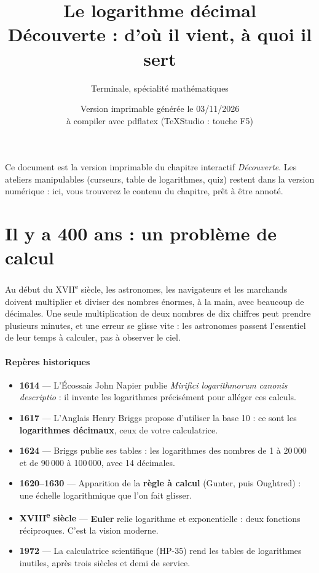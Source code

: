 \documentclass[11pt,a4paper]{article}
\title{Le logarithme décimal\\[2pt]\large Découverte : d'où il vient, à quoi il sert}
\author{Terminale, spécialité mathématiques}
\date{Version imprimable générée le 03/11/2026\\[2pt]\small à compiler avec pdflatex (TeXStudio : touche F5)}
\begin{document}
\maketitle

\noindent Ce document est la version imprimable du chapitre interactif \emph{Découverte}. Les ateliers manipulables (curseurs, table de logarithmes, quiz) restent dans la version numérique : ici, vous trouverez le contenu du chapitre, prêt à être annoté.

\section{Il y a 400 ans : un problème de calcul}
Au début du XVII\textsuperscript{e} siècle, les astronomes, les navigateurs et les marchands doivent multiplier et diviser des nombres énormes, à la main, avec beaucoup de décimales. Une seule multiplication de deux nombres de dix chiffres peut prendre plusieurs minutes, et une erreur se glisse vite : les astronomes passent l'essentiel de leur temps à calculer, pas à observer le ciel.

\paragraph{Repères historiques}
\begin{itemize}[leftmargin=1.5em,itemsep=2pt]
\item \textbf{1614} --- L'Écossais John Napier publie \emph{Mirifici logarithmorum canonis descriptio} : il invente les logarithmes précisément pour alléger ces calculs.
\item \textbf{1617} --- L'Anglais Henry Briggs propose d'utiliser la base 10 : ce sont les \textbf{logarithmes décimaux}, ceux de votre calculatrice.
\item \textbf{1624} --- Briggs publie ses tables : les logarithmes des nombres de 1 à 20\,000 et de 90\,000 à 100\,000, avec 14 décimales.
\item \textbf{1620--1630} --- Apparition de la \textbf{règle à calcul} (Gunter, puis Oughtred) : une échelle logarithmique que l'on fait glisser.
\item \textbf{XVIII\textsuperscript{e} siècle} --- \textbf{Euler} relie logarithme et exponentielle : deux fonctions réciproques. C'est la vision moderne.
\item \textbf{1972} --- La calculatrice scientifique (HP-35) rend les tables de logarithmes inutiles, après trois siècles et demi de service.
\end{itemize}
\end{document}
